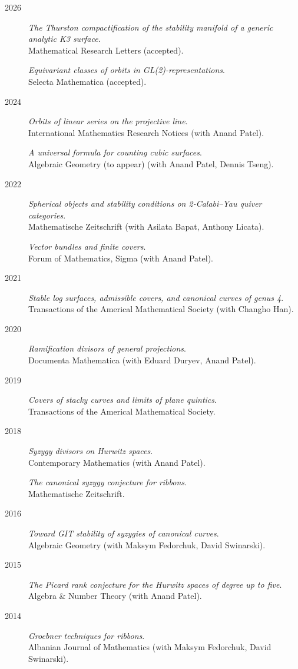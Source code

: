 \documentclass[11pt]{article}
\begin{document}
\label{org82e736f}
\begin{description}
\item[{2026}] \emph{The Thurston compactification of the stability manifold of a generic analytic K3 surface}.\\
Mathematical Research Letters (accepted).

\emph{Equivariant classes of orbits in GL(2)-representations}.\\
Selecta Mathematica (accepted).
\item[{2024}] \emph{Orbits of linear series on the projective line}.\\
International Mathematics Research Notices (with Anand Patel).

\emph{A universal formula for counting cubic surfaces}.\\
Algebraic Geometry (to appear) (with Anand Patel, Dennis Tseng).
\item[{2022}] \emph{Spherical objects and stability conditions on 2-Calabi--Yau quiver categories}.\\
Mathematische Zeitschrift (with Asilata Bapat, Anthony Licata).

\emph{Vector bundles and finite covers}.\\
Forum of Mathematics, Sigma (with Anand Patel).
\item[{2021}] \emph{Stable log surfaces, admissible covers, and canonical curves of genus 4}.\\
Transactions of the Americal Mathematical Society (with Changho Han).
\item[{2020}] \emph{Ramification divisors of general projections}.\\
Documenta Mathematica (with Eduard Duryev, Anand Patel).
\item[{2019}] \emph{Covers of stacky curves and limits of plane quintics}.\\
Transactions of the Americal Mathematical Society.
\item[{2018}] \emph{Syzygy divisors on Hurwitz spaces}.\\
Contemporary Mathematics (with Anand Patel).

\emph{The canonical syzygy conjecture for ribbons}.\\
Mathematische Zeitschrift.
\item[{2016}] \emph{Toward GIT stability of syzygies of canonical curves}.\\
Algebraic Geometry (with Maksym Fedorchuk, David Swinarski).
\item[{2015}] \emph{The Picard rank conjecture for the Hurwitz spaces of degree up to five}.\\
Algebra \& Number Theory (with Anand Patel).
\item[{2014}] \emph{Groebner techniques for ribbons}.\\
Albanian Journal of Mathematics (with Maksym Fedorchuk, David Swinarski).


\end{description}
\end{document}
